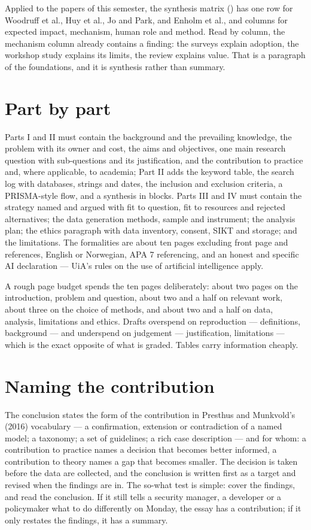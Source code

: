 \documentclass[11pt,a4paper,british,twoside=false,headings=small,chapterprefix=false,numbers=noenddot]{scrbook}
\begin{document}
Applied to the papers of this semester, the synthesis matrix () has one row for Woodruff et al., Huy et al., Jo and Park, and Enholm et al., and columns for expected impact, mechanism, human role and method. Read by column, the mechanism column already contains a finding: the surveys explain adoption, the workshop study explains its limits, the review explains value. That is a paragraph of the foundations, and it is synthesis rather than summary.

\section{Part by part}

Parts I and II must contain the background and the prevailing knowledge, the problem with its owner and cost, the aims and objectives, one main research question with sub-questions and its justification, and the contribution to practice and, where applicable, to academia; Part II adds the keyword table, the search log with databases, strings and dates, the inclusion and exclusion criteria, a PRISMA-style flow, and a synthesis in blocks. Parts III and IV must contain the strategy named and argued with fit to question, fit to resources and rejected alternatives; the data generation methods, sample and instrument; the analysis plan; the ethics paragraph with data inventory, consent, SIKT and storage; and the limitations. The formalities are about ten pages excluding front page and references, English or Norwegian, APA 7 referencing, and an honest and specific AI declaration --- UiA's rules on the use of artificial intelligence apply.

A rough page budget spends the ten pages deliberately: about two pages on the introduction, problem and question, about two and a half on relevant work, about three on the choice of methods, and about two and a half on data, analysis, limitations and ethics. Drafts overspend on reproduction --- definitions, background --- and underspend on judgement --- justification, limitations --- which is the exact opposite of what is graded. Tables carry information cheaply.

\section{Naming the contribution}

The conclusion states the form of the contribution in Presthus and Munkvold's (2016) vocabulary --- a confirmation, extension or contradiction of a named model; a taxonomy; a set of guidelines; a rich case description --- and for whom: a contribution to practice names a decision that becomes better informed, a contribution to theory names a gap that becomes smaller. The decision is taken before the data are collected, and the conclusion is written first as a target and revised when the findings are in. The so-what test is simple: cover the findings, and read the conclusion. If it still tells a security manager, a developer or a policymaker what to do differently on Monday, the essay has a contribution; if it only restates the findings, it has a summary.
\end{document}
